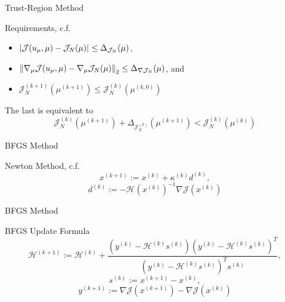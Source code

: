 \begin{frame}{Trust-Region Method}
    \begin{block}{Requirements, c.f.~\cite{Qian2017}}
        \begin{itemize}
            \item $\abs{\mathcal{J}(u_\mu, \mu) - \mathcal{J}_N(\mu)} \leq \Delta_{\mathcal{J}_N}(\mu)$,
            \item $\norm[2]{\nabla_\mu \mathcal{J}(u_\mu, \mu) - \nabla_\mu \mathcal{J}_N(\mu)} \leq \Delta_{\nabla \mathcal{J}_N}(\mu)$, and
            \item $\mathcal{J}_N^{(k + 1)}(\mu^{(k + 1)}) \leq \mathcal{J}_N^{(k)}(\mu^{(k, 0)})$
        \end{itemize}
    \end{block}

    The last is equivalent to
    \begin{equation*}
        \mathcal{J}_N^{(k)}(\mu^{(k + 1)}) + \Delta_{\mathcal{J}_N^{(k)}}(\mu^{(k + 1)}) < \mathcal{J}_N^{(k)}(\mu^{(k)})
    \end{equation*}
\end{frame}

\begin{frame}{BFGS Method}
    \begin{block}{Newton Method, c.f.~\cite{Nocedal2006}}
        \vspace*{-8pt}
        \[ x^{(k + 1)} := x^{(k)} + \kappa^{(k)} d^{(k)}, \]
        \[ d^{(k)} := - {\mathcal{H}(x^{(k)})}^{-1} \nabla \mathcal{J}(x^{(k)}) \]
    \end{block}

\end{frame}

\begin{frame}{BFGS Method}
    \begin{block}{BFGS Update Formula}
        \vspace*{-8pt}
        \[ \mathcal{H}^{(k + 1)} := \mathcal{H}^{(k)} + \frac{(y^{(k)} - \mathcal{H}^{(k)} s^{(k)}){(y^{(k)} - \mathcal{H}^{(k)} s^{(k)})}^T}{{(y^{(k)} - \mathcal{H}^{(k)} s^{(k)})}^T s^{(k)}}, \]
        \[ s^{(k)} := x^{(k + 1)} - x^{(k)}, \]
        \[ y^{(k + 1)} := \nabla \mathcal{J}(x^{(k + 1)}) - \nabla \mathcal{J}(x^{(k)}) \]
    \end{block}
\end{frame}